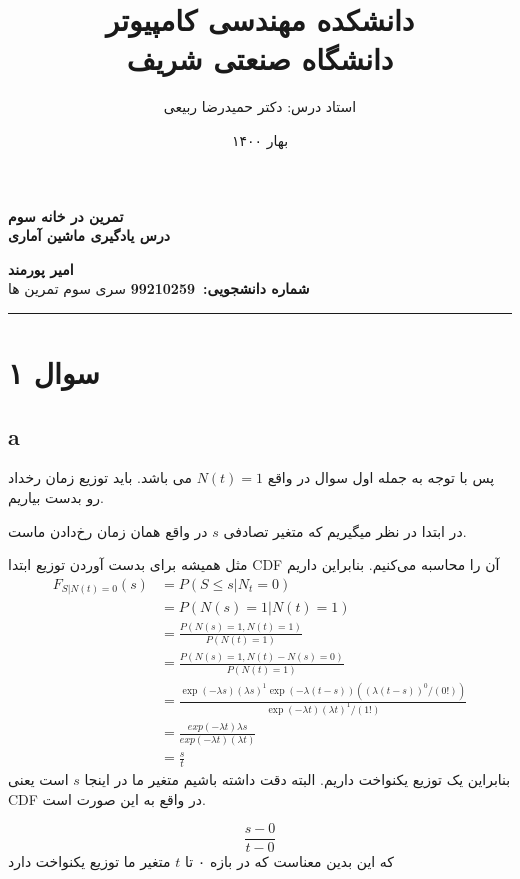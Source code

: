\documentclass{article}[12pt]
\title{   
    دانشکده مهندسی کامپیوتر
    \\
    دانشگاه صنعتی شریف
}
\author{استاد درس: دکتر حمیدرضا ربیعی}
\date{بهار ۱۴۰۰}
\def \Subject {
تمرین در خانه سوم
}
\def \Course {
درس یادگیری ماشین آماری
}
\def \Author {امیر پورمند}
\def \Report {سری سوم تمرین ها}
\def \StudentNumber {99210259}
\begin{document}
 \maketitle
 
\begin{center}
\vspace{.4cm}
{\bf {\huge \Subject}}\\
{\bf \Large \Course}
\vspace{.2cm}
\end{center}
{\bf \Author }  \\
{\bf شماره دانشجویی:\ \StudentNumber}
\hspace{\fill} 
{\Large \Report} \\
\hrule
\vspace{0.8cm}

\clearpage
 
\section{سوال ۱}
\subsection{a}
پس با توجه به جمله اول سوال در واقع 
$N(t) =1 $
می باشد. 
باید توزیع زمان رخداد رو بدست بیاریم.


در ابتدا در نظر میگیریم که متغیر 
تصادفی 
$s$
در واقع همان زمان رخ‌دادن ماست. 

مثل همیشه برای بدست آوردن توزیع ابتدا CDF 
آن را محاسبه می‌کنیم. 
بنابراین داریم
\begin{equation}
\begin{split}
F_{S|N(t)=0}(s) &= P(S \leq s | N_t = 0)\\
 &= 
P(N(s) = 1 | N(t) = 1)  \\ &= 
\frac{P(N(s)=1, N(t) = 1)}{P(N(t)=1)} \\& = 
\frac{P(N(s)=1,N(t)-N(s)=0)}{P(N(t)=1)}
\\&= 
\frac{\exp(-\lambda s)(\lambda s)^1 
\exp(- \lambda (t-s)) ((\lambda(t-s))^0/(0!))
}{
\exp(- \lambda t)(\lambda t)^1 / (1!)
}
  \\&=
 \frac{
exp(- \lambda t ) \lambda s }
{
exp(- \lambda t) (\lambda t) 
} \\&= \frac{s}{t}
\end{split}
\end{equation}
بنابراین یک توزیع یکنواخت داریم. 
البته دقت داشته باشیم متغیر ما در اینجا 
$s$
است یعنی CDF  در واقع به این صورت است. 

\begin{equation*}
\frac{s-0}{t-0}
\end{equation*}
که این بدین معناست که در بازه ۰ تا 
$t$
متغیر ما توزیع یکنواخت دارد 
\end{document}
